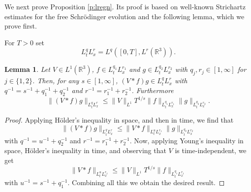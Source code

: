 \documentclass[11pt,a4paper,draft,DIV11]{scrartcl}	%
\newtheorem{lem}[thm]{Lemma}
\newcommand{\R}{\mathds{R}}
\begin{document}
We next prove Proposition \ref{p:lregn}. Its proof is based on well-known
Strichartz estimates for the free Schr\"odinger evolution and the following
lemma, which we prove first.


For $T > 0$ set
\[
  L_t^q L_x^r = L^q([0,T], L^r(\R^3)).
\]


\begin{lem} \label{l:interp}
  Let $V \in L^1(\R^3)$, $f \in L_t^{q_1} L_x^{r_1}$ and $g \in L_t^{q_2}
  L_x^{r_2}$ with $q_j, r_j \in [1,\infty]$ for $j \in \{1,2\}$. Then, for any $s \in [1, \infty]$, $(V * f)
  g \in L_t^q L_x^r$ with $q^{-1} = s^{-1} + q_1^{-1} + q_2^{-1}$ and $r^{-1}
  = r_1^{-1} + r_2^{-1}$. Furthermore
  \[
    \| (V * f)g \|_{L_t^q L_x^r} \le \| V \|_{L^1} T^{1/s} \| f \|_{L_t^{q_1}
    L_x^{r_1}} \| g \|_{L_t^{q_2} L_x^{r_2}}.
  \]
\end{lem}


\begin{proof}
  Applying H\"older's inequality in space, and then in time, we find that
  \[
    \| (V * f) g \|_{L_t^q L_x^r} \le \| V * f \|_{L_t^u L_x^{r_1}} \| g
    \|_{L_t^{q_2} L_x^{r_2}}
  \]
  with $q^{-1} = u^{-1} + q_2^{-1}$ and $r^{-1} = r_1^{-1} + r_2^{-1}$. Now,
  applying Young's inequality in space, H\"older's inequality in time, and
  observing that $V$ is time-independent, we get
  \[
    \| V * f \|_{L_t^u L_x^{r_1}} \le \| V \|_{L^1} T^{1/s} \| f \|_{L_t^{q_1}
    L_x^{r_1}}
  \]
  with $u^{-1} = s^{-1} + q_1^{-1}$. Combining all this we obtain the desired
  result.
\end{proof}
\end{document}
